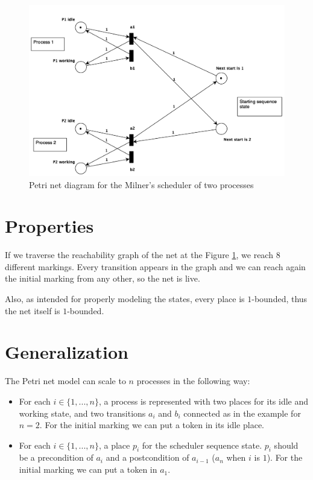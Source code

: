\documentclass{article}
\begin{document}
\begin{figure}
  \includegraphics[width=\textwidth]{milner-scheduler-net.png}
  \caption{
    Petri net diagram for the Milner's scheduler 
    of two processes
  }
  \label{fig:diagram}
\end{figure}

\section{Properties}

If we traverse the reachability graph of the net at the 
Figure \ref{fig:diagram}, we reach $8$ different markings. 
Every transition appears in the graph and we can reach again 
the initial marking from any other, so the net is live.

Also, as intended for properly modeling the states, every place 
is $1$-bounded, thus the net itself is $1$-bounded.

\section{Generalization}

The Petri net model can scale to $n$ processes in the following way:

\begin{itemize}
  \item For each $i \in \{1,...,n\}$, a process is represented with 
    two places for its idle and working state, and two transitions 
    $a_i$ and $b_i$ connected as in the example for $n=2$. For the 
    initial marking we can put a token in its idle place.
  \item For each $i \in \{1,...,n\}$, a place $p_i$ for the scheduler 
    sequence state. $p_i$ should be a precondition of $a_i$ and a 
    postcondition of $a_{i-1}$ ($a_{n}$ when $i$ is $1$). For the 
    initial marking we can put a token in $a_1$.
\end{itemize}
\end{document}
